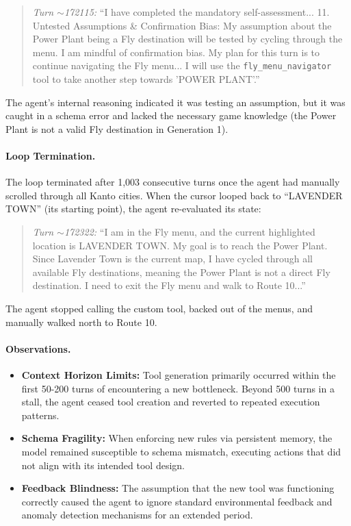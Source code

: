 \begin{quote}
\emph{Turn $\sim$172115:} ``I have completed the mandatory self-assessment... 11. Untested Assumptions \& Confirmation Bias: My assumption about the Power Plant being a Fly destination will be tested by cycling through the menu. I am mindful of confirmation bias. My plan for this turn is to continue navigating the Fly menu... I will use the \texttt{fly\_menu\_navigator} tool to take another step towards 'POWER PLANT'.''
\end{quote}

The agent's internal reasoning indicated it was testing an assumption, but it was caught in a schema error and lacked the necessary game knowledge (the Power Plant is not a valid Fly destination in Generation 1).

\paragraph{Loop Termination.} The loop terminated after 1{,}003 consecutive turns once the agent had manually scrolled through all Kanto cities. When the cursor looped back to ``LAVENDER TOWN'' (its starting point), the agent re-evaluated its state:

\begin{quote}
\emph{Turn $\sim$172322:} ``I am in the Fly menu, and the current highlighted location is LAVENDER TOWN. My goal is to reach the Power Plant. Since Lavender Town is the current map, I have cycled through all available Fly destinations, meaning the Power Plant is not a direct Fly destination. I need to exit the Fly menu and walk to Route 10...''
\end{quote}

The agent stopped calling the custom tool, backed out of the menus, and manually walked north to Route 10.

\paragraph{Observations.}
\begin{itemize}
    \item \textbf{Context Horizon Limits:} Tool generation primarily occurred within the first 50-200 turns of encountering a new bottleneck. Beyond 500 turns in a stall, the agent ceased tool creation and reverted to repeated execution patterns.
    \item \textbf{Schema Fragility:} When enforcing new rules via persistent memory, the model remained susceptible to schema mismatch, executing actions that did not align with its intended tool design.
    \item \textbf{Feedback Blindness:} The assumption that the new tool was functioning correctly caused the agent to ignore standard environmental feedback and anomaly detection mechanisms for an extended period.
\end{itemize}
